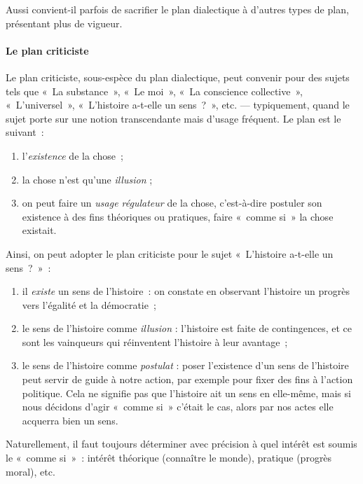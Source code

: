 \documentclass[a4paper,12pt]{article}
\begin{document}
Aussi convient-il parfois de sacrifier le plan dialectique à d'autres
types de plan, présentant plus de vigueur.

\paragraph{Le plan criticiste}
\label{sec-2-4-2-2}

Le plan criticiste, sous-espèce du plan dialectique, peut convenir pour
des sujets tels que « La substance », « Le moi », « La conscience
collective », « L'universel », « L'histoire a-t-elle un sens ? », etc. ---
typiquement, quand le sujet porte sur une notion transcendante mais
d'usage fréquent. Le plan est le suivant :

\begin{enumerate}
\item l'\emph{existence} de la chose ;

\item la chose n'est qu'une \emph{illusion} ;

\item on peut faire un \emph{usage régulateur} de la chose, c'est-à-dire
postuler son existence à des fins théoriques ou pratiques, faire
« comme si » la chose existait.
\end{enumerate}

Ainsi, on peut adopter le plan criticiste pour le sujet « L'histoire
a-t-elle un sens ? » :

\begin{enumerate}
\item il \emph{existe} un sens de l'histoire : on constate en observant
l'histoire un progrès vers l'égalité et la démocratie ;

\item le sens de l'histoire comme \emph{illusion} : l'histoire est faite de
contingences, et ce sont les vainqueurs qui réinventent l'histoire à
leur avantage ;

\item le sens de l'histoire comme \emph{postulat} : poser l'existence d'un sens
de l'histoire peut servir de guide à notre action, par exemple pour
fixer des fins à l'action politique. Cela ne signifie pas que
l'histoire ait un sens en elle-même, mais si nous décidons d'agir
« comme si » c'était le cas, alors par nos actes elle acquerra bien un
sens.
\end{enumerate}

Naturellement, il faut toujours déterminer avec précision à quel intérêt
est soumis le « comme si » : intérêt théorique (connaître le monde),
pratique (progrès moral), etc.
\end{document}
